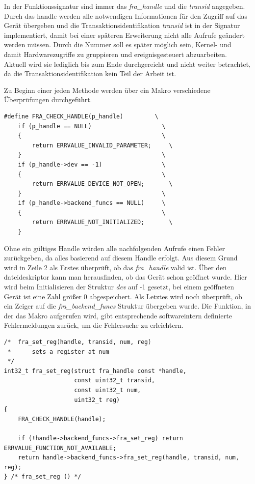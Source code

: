 In der Funktionssignatur sind immer das \textit{fra\_handle} und die \textit{transid} angegeben. Durch das \gls{handle} werden alle notwendigen Informationen für den Zugriff auf das Gerät übergeben und die Transaktionsidentifikation \textit{transid} ist in der Signatur implementiert, damit bei einer späteren Erweiterung nicht alle Aufrufe geändert werden müssen. Durch die Nummer soll es später möglich sein, Kernel- und damit Hardwarezugriffe zu gruppieren und ereignisgesteuert abzuarbeiten. Aktuell wird sie lediglich bis zum Ende durchgereicht und nicht weiter betrachtet, da die Transaktionsidentifikation kein Teil der Arbeit ist. 


Zu Beginn einer jeden Methode werden über ein Makro verschiedene Überprüfungen durchgeführt. 

\begin{lstfloat}
\begin{lstlisting}
#define FRA_CHECK_HANDLE(p_handle)         \
	if (p_handle == NULL)                    \
	{                                        \
		return ERRVALUE_INVALID_PARAMETER;     \
	}                                        \
	if (p_handle->dev == -1)                 \
	{                                        \
		return ERRVALUE_DEVICE_NOT_OPEN;       \
	}                                        \
	if (p_handle->backend_funcs == NULL)     \
	{                                        \
		return ERRVALUE_NOT_INITIALIZED;       \
	}  
\end{lstlisting}
\end{lstfloat}

Ohne ein gültiges Handle würden alle nachfolgenden Aufrufe einen Fehler zurückgeben, da alles basierend auf diesem Handle erfolgt. Aus diesem Grund wird in Zeile 2 als Erstes überprüft, ob das \textit{fra\_handle} valid ist. Über den \gls{dateideskriptor} kann man herausfinden, ob das Gerät schon geöffnet wurde. Hier wird beim Initialisieren der Struktur \textit{dev} auf -1 gesetzt, bei einem geöffneten Gerät ist eine Zahl größer 0 abgespeichert. Als Letztes wird noch überprüft, ob ein Zeiger auf die \textit{fra\_backend\_funcs} Struktur übergeben wurde. Die Funktion, in der das Makro aufgerufen wird, gibt entsprechende softwareintern definierte Fehlermeldungen zurück, um die Fehlersuche zu erleichtern.\\


\begin{lstfloat}
\begin{lstlisting}
/*  fra_set_reg(handle, transid, num, reg)
 *      sets a register at num
 */
int32_t fra_set_reg(struct fra_handle const *handle,
					const uint32_t transid,
					const uint32_t num, 
					uint32_t reg)
{
	FRA_CHECK_HANDLE(handle);

	if (!handle->backend_funcs->fra_set_reg) return ERRVALUE_FUNCTION_NOT_AVAILABLE;
	return handle->backend_funcs->fra_set_reg(handle, transid, num, reg);
} /* fra_set_reg () */
\end{lstlisting}
\end{lstfloat}

